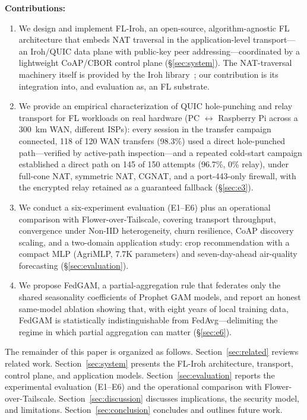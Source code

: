 ﻿\documentclass[journal]{IEEEtran}
\begin{document}
\noindent\textbf{Contributions:}
\begin{enumerate}
    \item We design and implement FL-Iroh, an open-source, algorithm-agnostic FL architecture that embeds NAT traversal in the application-level transport---an Iroh/QUIC data plane with public-key peer addressing---coordinated by a lightweight CoAP/CBOR control plane (\S\ref{sec:system}). The NAT-traversal machinery itself is provided by the Iroh library~\cite{iroh2024}; our contribution is its integration into, and evaluation as, an FL substrate.
    \item We provide an empirical characterization of QUIC hole-punching and relay transport for FL workloads on real hardware (PC $\leftrightarrow$ Raspberry Pi across a 300~km WAN, different ISPs): every session in the transfer campaign connected, 118 of 120 WAN transfers (98.3\%) used a direct hole-punched path---verified by active-path inspection---and a repeated cold-start campaign established a direct path on 145 of 150 attempts (96.7\%, 0\% relay), under full-cone NAT, symmetric NAT, CGNAT, and a port-443-only firewall, with the encrypted relay retained as a guaranteed fallback (\S\ref{sec:e3}).
    \item We conduct a six-experiment evaluation (E1--E6) plus an operational comparison with Flower-over-Tailscale, covering transport throughput, convergence under Non-IID heterogeneity, churn resilience, CoAP discovery scaling, and a two-domain application study: crop recommendation with a compact MLP (AgriMLP, 7.7K parameters) and seven-day-ahead air-quality forecasting (\S\ref{sec:evaluation}).
    \item We propose FedGAM, a partial-aggregation rule that federates only the shared seasonality coefficients of Prophet GAM models, and report an honest same-model ablation showing that, with eight years of local training data, FedGAM is statistically indistinguishable from FedAvg---delimiting the regime in which partial aggregation can matter (\S\ref{sec:e6}).
\end{enumerate}

The remainder of this paper is organized as follows. Section~\ref{sec:related} reviews related work. Section~\ref{sec:system} presents the FL-Iroh architecture, transport, control plane, and application models. Section~\ref{sec:evaluation} reports the experimental evaluation (E1--E6) and the operational comparison with Flower-over-Tailscale. Section~\ref{sec:discussion} discusses implications, the security model, and limitations. Section~\ref{sec:conclusion} concludes and outlines future work.
\end{document}
